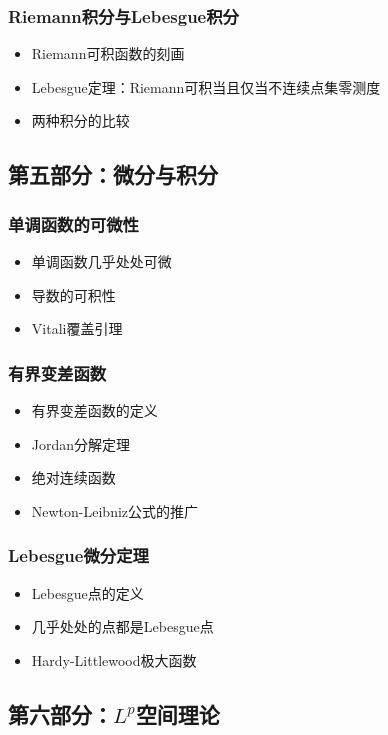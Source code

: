 \subsubsection{Riemann积分与Lebesgue积分}
\begin{itemize}
    \item Riemann可积函数的刻画
    \item Lebesgue定理：Riemann可积当且仅当不连续点集零测度
    \item 两种积分的比较
\end{itemize}

\subsection{第五部分：微分与积分}

\subsubsection{单调函数的可微性}
\begin{itemize}
    \item 单调函数几乎处处可微
    \item 导数的可积性
    \item Vitali覆盖引理
\end{itemize}

\subsubsection{有界变差函数}
\begin{itemize}
    \item 有界变差函数的定义
    \item Jordan分解定理
    \item 绝对连续函数
    \item Newton-Leibniz公式的推广
\end{itemize}

\subsubsection{Lebesgue微分定理}
\begin{itemize}
    \item Lebesgue点的定义
    \item 几乎处处的点都是Lebesgue点
    \item Hardy-Littlewood极大函数
\end{itemize}

\subsection{第六部分：$L^p$空间理论}

